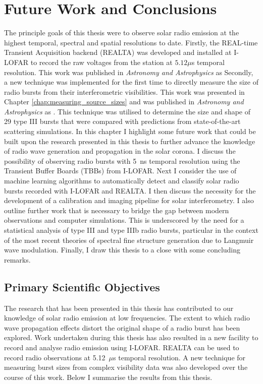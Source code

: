 \doublespacing
\chapter{Future Work and Conclusions}
\label{chap:future}
The principle goals of this thesis were to observe solar radio emission at the highest temporal, spectral and spatial resolutions to date. Firstly, the REAL-time Transient Acquisition backend (REALTA) was developed and installed at I-LOFAR to record the raw voltages from the station at $5.12 \mu$s temporal resolution. This work was published in \textit{Astronomy and Astrophysics} as \cite{Murphy2021b}
Secondly, a new technique was implemented for the first time to directly measure the size of radio bursts from their interferometric visibilities. This work was presented in Chapter \ref{chap:measuring_source_sizes} and was published in \textit{Astronomy and Astrophysics} as \cite{Murphy2021}. This technique was utilised to determine the size and shape of 29 type III bursts that were compared with predictions from state-of-the-art scattering simulations.
In this chapter I highlight some future work that could be built upon the research presented in this thesis to further advance the knowledge of radio wave generation and propagation in the solar corona. I discuss the possibility of observing radio bursts with 5~ns temporal resolution using the Transient Buffer Boards (TBBs) from I-LOFAR. Next I consider the use of machine learning algorithms to automatically detect and classify solar radio bursts recorded with I-LOFAR and REALTA. I then discuss the necessity for the development of a calibration and imaging pipeline for solar interferometry. I also outline further work that is necessary to bridge the gap between modern observations and computer simulations. This is underscored by the need for a statistical analysis of type III and type IIIb radio bursts, particular in the context of the most recent theories of spectral fine structure generation due to Langmuir wave modulation. Finally, I draw this thesis to a close with some concluding remarks.

\section{Primary Scientific Objectives}
The research that has been presented in this thesis has contributed to our knowledge of solar radio emission at low frequencies. The extent to which radio wave propagation effects distort the original shape of a radio burst has been explored. Work undertaken during this thesis has also resulted in a new facility to record and analyse radio emission using I-LOFAR. REALTA can be used to record radio observations at 5.12~$\mu$s temporal resolution. A new technique for measuring burst sizes from complex visibility data was also developed over the course of this work. Below I summarise the results from this thesis. 

